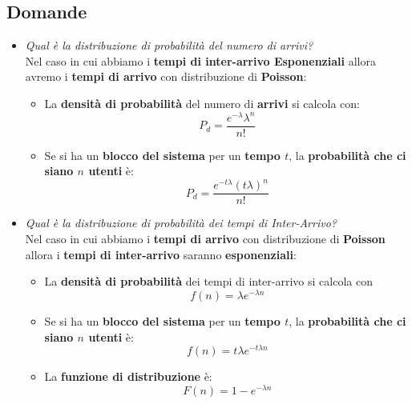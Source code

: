 \subsection{Domande} %

\begin{itemize}
    \item \textit{Qual è la distribuzione di probabilità del numero di arrivi?}
          \vspace{0.3cm}
          \\Nel caso in cui abbiamo i \textbf{tempi di inter-arrivo
              Esponenziali} allora avremo i \textbf{tempi di arrivo} con
          distribuzione di \textbf{Poisson}:
          \begin{itemize}
              \item La \textbf{densità di probabilità} del numero di
                    \textbf{arrivi} si calcola con:
                    $$P_d = \frac{e^{-\lambda} \lambda^n}{n!}$$
              \item Se si ha un \textbf{blocco del sistema} per un \textbf{tempo
                        $t$}, la \textbf{probabilità che ci siano $n$ utenti} è:
                    $$P_d = \frac{e^{-t\lambda} \left ( t\lambda \right
                            )^n}{n!}$$
          \end{itemize}

    \item \textit{Qual è la distribuzione di probabilità dei tempi di
              Inter-Arrivo?}
          \vspace{0.3cm}
          \\Nel caso in cui abbiamo i \textbf{tempi di arrivo} con distribuzione
          di \textbf{Poisson} allora i \textbf{tempi di inter-arrivo} saranno
          \textbf{esponenziali}:
          \begin{itemize}
              \item La \textbf{densità di probabilità} dei tempi di inter-arrivo
                    si calcola con $$f(n) = \lambda e^{-\lambda n}$$
              \item Se si ha un \textbf{blocco del sistema} per un \textbf{tempo
                        $t$}, la \textbf{probabilità che ci siano $n$ utenti} è:
                    $$f(n) = t\lambda e^{-t\lambda n}$$
              \item La \textbf{funzione di distribuzione} è: $$F(n) = 1 -
                        e^{-\lambda n}$$
          \end{itemize}
\end{itemize}

